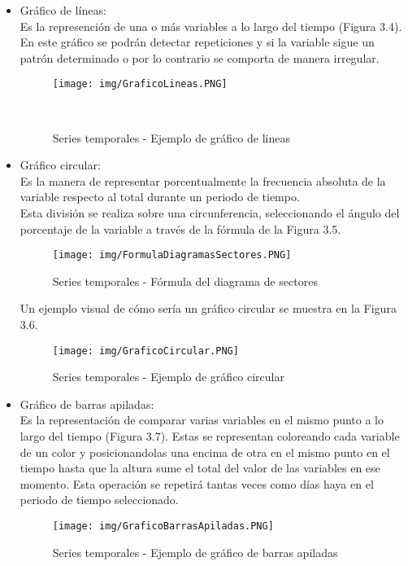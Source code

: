\begin{itemize}
    \item Gráfico de líneas:\cite{diagramaLineas}\\
    Es la represención de una o más variables a lo largo del tiempo (Figura 3.4). En este gráfico se podrán detectar repeticiones y si la variable sigue un patrón determinado o por lo contrario se comporta de manera irregular.
    \begin{figure}[h!]
        \centering
        \texttt{[image: img/GraficoLineas.PNG]}
        \caption{Series temporales - Ejemplo de gráfico de lineas}\\
        \label{Series temporales - Ejemplo de gráfico de lineas}
    \end{figure}
    \item Gráfico circular:\cite{diagramaSectores}\\
    Es la manera de representar porcentualmente la frecuencia absoluta de la variable respecto al total durante un periodo de tiempo. \\
    Esta división se realiza sobre una circunferencia, seleccionando el ángulo del porcentaje de la variable a través de la fórmula de la Figura 3.5.
    \begin{figure}[h!]
        \centering
        \texttt{[image: img/FormulaDiagramasSectores.PNG]}
        \caption{Series temporales - Fórmula del diagrama de sectores}
        \label{Series temporales - Fórmula del diagrama de sectores}
    \end{figure}
    Un ejemplo visual de cómo sería un gráfico circular se muestra en la Figura 3.6.
    \begin{figure}[h!]
        \centering
        \texttt{[image: img/GraficoCircular.PNG]}
        \caption{Series temporales - Ejemplo de gráfico circular}
        \label{Series temporales - Ejemplo de gráfico circular}
    \end{figure}
    \item Gráfico de barras apiladas:\\
    Es la representación de comparar varias variables en el mismo punto a lo largo del tiempo (Figura 3.7). Estas se representan coloreando cada variable de un color y posicionandolas una encima de otra en el mismo punto en el tiempo hasta que la altura sume el total del valor de las variables en ese momento. Esta operación se repetirá tantas veces como días haya en el periodo de tiempo seleccionado.
    \begin{figure}[h!]
        \centering
        \texttt{[image: img/GraficoBarrasApiladas.PNG]}
        \caption{Series temporales - Ejemplo de gráfico de barras apiladas}
        \label{Series temporales - Ejemplo de gráfico de barras apiladas}
    \end{figure}
\end{itemize}
